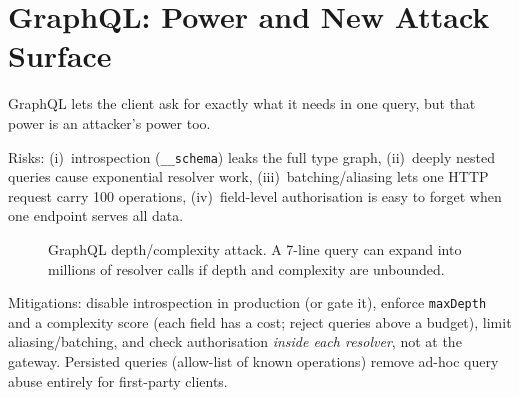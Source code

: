 \section{GraphQL: Power and New Attack Surface}
\label{sec:graphql}
GraphQL lets the client ask for exactly what it needs in one query, but that power is an attacker's power too.

Risks: (i)~introspection (\texttt{\_\_schema}) leaks the full type graph, (ii)~deeply nested queries cause exponential resolver work, (iii)~batching/aliasing lets one HTTP request carry 100 operations, (iv)~field-level authorisation is easy to forget when one endpoint serves all data.

\begin{figure}[h]\centering
{}
\caption{GraphQL depth/complexity attack. A 7-line query can expand into millions of resolver calls if depth and complexity are unbounded.}
\label{fig:graphql-depth}
\end{figure}

Mitigations: disable introspection in production (or gate it), enforce \texttt{maxDepth} and a complexity score (each field has a cost; reject queries above a budget), limit aliasing/batching, and check authorisation \emph{inside each resolver}, not at the gateway. Persisted queries (allow-list of known operations) remove ad-hoc query abuse entirely for first-party clients.


